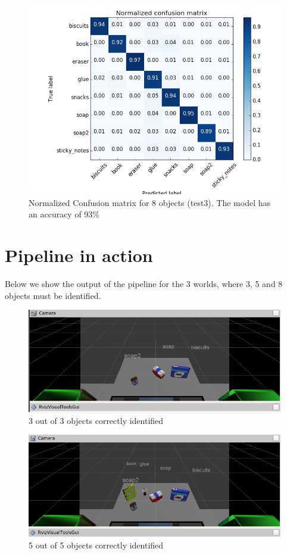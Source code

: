 \documentclass[a4paper,12pt]{report}
\begin{document}
\begin{figure}[H]
\centering
        \includegraphics[totalheight=9cm]{imgs/test3.png}
        \caption{Normalized Confusion matrix for 8 objects (test3).  The model has an accuracy of 93\%}
\end{figure}

\section{Pipeline in action}
Below we show the output of the pipeline for the 3 worlds, where 3, 5 and 8 objects must be identified.

\begin{figure}[H]
\centering
        \includegraphics[totalheight=6cm]{imgs/result1.png}
        \caption{3 out of 3 objects correctly identified}
\end{figure}

\begin{figure}[H]
\centering
        \includegraphics[totalheight=6cm]{imgs/result2.png}
        \caption{5 out of 5 objects correctly identified}
\end{figure}
\end{document}
